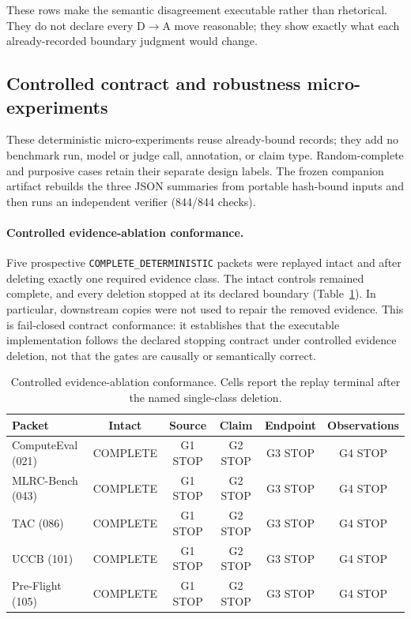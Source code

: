These rows make the semantic disagreement executable rather than rhetorical.  They do not declare every D\(\to\)A move reasonable; they show exactly what each already-recorded boundary judgment would change.

\subsection{Controlled contract and robustness micro-experiments}
\label{app:microexperiments}

These deterministic micro-experiments reuse already-bound records; they add no benchmark run, model or judge call, annotation, or claim type.  Random-complete and purposive cases retain their separate design labels.  The frozen companion artifact rebuilds the three JSON summaries from portable hash-bound inputs and then runs an independent verifier (844/844 checks).

\paragraph{Controlled evidence-ablation conformance.}
Five prospective \texttt{COMPLETE\_DETERMINISTIC} packets were replayed intact and after deleting exactly one required evidence class.  The intact controls remained complete, and every deletion stopped at its declared boundary (Table~\ref{tab:microexp-ablation}).  In particular, downstream copies were not used to repair the removed evidence.  This is fail-closed contract conformance: it establishes that the executable implementation follows the declared stopping contract under controlled evidence deletion, not that the gates are causally or semantically correct.

\begin{table}[ht]
\centering
\caption{Controlled evidence-ablation conformance.  Cells report the replay terminal after the named single-class deletion.}
\label{tab:microexp-ablation}
\footnotesize
\setlength{\tabcolsep}{3pt}
\begin{tabularx}{\linewidth}{@{}p{.21\linewidth}ccccc@{}}
\toprule Packet & Intact & Source & Claim & Endpoint & Observations \\
\midrule
ComputeEval (021) & COMPLETE & G1 STOP & G2 STOP & G3 STOP & G4 STOP \\
MLRC-Bench (043) & COMPLETE & G1 STOP & G2 STOP & G3 STOP & G4 STOP \\
TAC (086) & COMPLETE & G1 STOP & G2 STOP & G3 STOP & G4 STOP \\
UCCB (101) & COMPLETE & G1 STOP & G2 STOP & G3 STOP & G4 STOP \\
Pre-Flight (105) & COMPLETE & G1 STOP & G2 STOP & G3 STOP & G4 STOP \\
\bottomrule
\end{tabularx}
\end{table}

